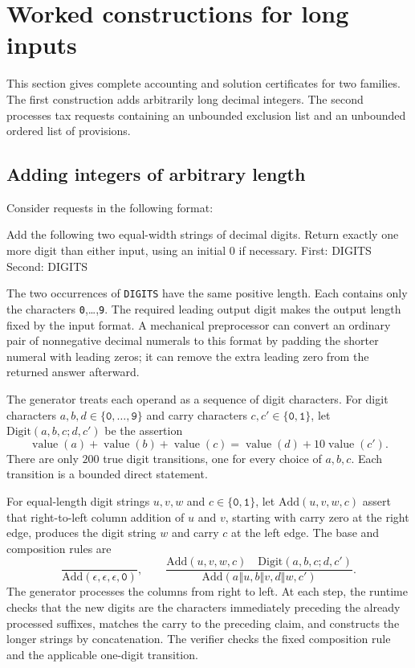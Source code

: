 \documentclass[11pt,twoside]{article}
\theoremstyle{definition}
\newcommand{\cat}{\mathbin{\Vert}}
\begin{document}
\section{Worked constructions for long inputs}
\label{sec:long-format-inputs}

This section gives complete accounting and solution certificates for two
families. The first construction adds arbitrarily long decimal integers. The
second processes tax requests containing an unbounded exclusion list and an
unbounded ordered list of provisions.

\subsection{Adding integers of arbitrary length}
\label{sec:long-addition}

Consider requests in the following format:
\begin{code}
Add the following two equal-width strings of decimal digits.
Return exactly one more digit than either input, using an initial 0 if necessary.
First: DIGITS
Second: DIGITS
\end{code}
The two occurrences of \texttt{DIGITS} have the same positive length. Each
contains only the characters \texttt{0},\ldots,\texttt{9}. The required leading
output digit makes the output length fixed by the input format. A mechanical
preprocessor can convert an ordinary pair of nonnegative decimal numerals to
this format by padding the shorter numeral with leading zeros; it can remove
the extra leading zero from the returned answer afterward.

The generator treats each operand as a sequence of digit characters. For digit
characters $a,b,d\in\{\texttt{0},\ldots,\texttt{9}\}$ and carry characters
$c,c'\in\{\texttt{0},\texttt{1}\}$, let
$\mathrm{Digit}(a,b,c;d,c')$ be the assertion
\begin{equation}
 \operatorname{value}(a)+\operatorname{value}(b)+\operatorname{value}(c)
 =\operatorname{value}(d)+10\operatorname{value}(c').
\label{eq:digit-transition}
\end{equation}
There are only $200$ true digit transitions, one for every choice of $a,b,c$.
Each transition is a bounded direct statement.

For equal-length digit strings $u,v,w$ and $c\in\{\texttt{0},\texttt{1}\}$,
let $\mathrm{Add}(u,v,w,c)$ assert that right-to-left column addition of $u$
and $v$, starting with carry zero at the right edge, produces the digit string
$w$ and carry $c$ at the left edge. The base and composition rules are
\begin{equation}
 \frac{}{\mathrm{Add}(\epsilon,\epsilon,\epsilon,\texttt{0})},
 \qquad
 \frac{\mathrm{Add}(u,v,w,c)\quad
       \mathrm{Digit}(a,b,c;d,c')}
      {\mathrm{Add}(a\cat u,b\cat v,d\cat w,c')}.
\label{eq:add-columns}
\end{equation}
The generator processes the columns from right to left. At each step, the
runtime checks that the new digits are the characters immediately preceding
the already processed suffixes, matches the carry to the preceding claim, and
constructs the longer strings by concatenation. The verifier checks the fixed
composition rule and the applicable one-digit transition.
\end{document}
